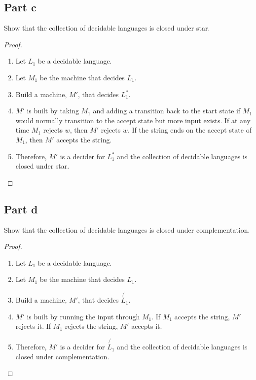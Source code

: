 \documentclass{article}
\begin{document}
\subsection{Part c}

Show that the collection of decidable languages is closed under star.

\begin{proof}
		\mbox{}
		\begin{enumerate}
		  \item Let $L_1$ be a decidable language.
		  \item Let $M_1$ be the machine that decides $L_1$.
		  \item Build a machine, $M'$, that decides $L_1^*$.
		  \item $M'$ is built by taking $M_1$ and adding a transition back to the
		  start state if $M_1$ would normally transition to the accept state but more
		  input exists. If at any time $M_1$ rejects $w$, then $M'$ rejects $w$. If
		  the string ends on the accept state of $M_1$, then $M'$ accepts the string.
		  \item Therefore, $M'$ is a decider for $L_1^*$ and the collection
		  of decidable languages is closed under star. \qedhere
		\end{enumerate}
\end{proof}

\subsection{Part d}

Show that the collection of decidable languages is closed under complementation.

\begin{proof}
		\mbox{}
		\begin{enumerate}
		  \item Let $L_1$ be a decidable language.
		  \item Let $M_1$ be the machine that decides $L_1$.
		  \item Build a machine, $M'$, that decides $\not{L_1}$.
		  \item $M'$ is built by running the input through $M_1$. If $M_1$ accepts the
		  string, $M'$ rejects it. If $M_1$ rejects the string, $M'$ accepts it.
		  \item Therefore, $M'$ is a decider for $\not{L_1}$ and the collection
		  of decidable languages is closed under complementation. \qedhere
		\end{enumerate}
\end{proof}
\end{document}
